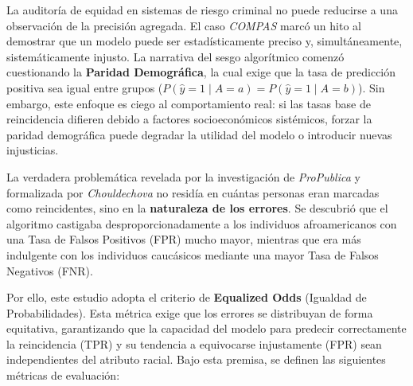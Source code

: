 \documentclass[11pt,a4paper]{article}
\begin{document}
La auditoría de equidad en sistemas de riesgo criminal no puede reducirse a una observación de la precisión agregada. El caso \textit{COMPAS} \cite{angwin2016machine} marcó un hito al demostrar que un modelo puede ser estadísticamente preciso y, simultáneamente, sistemáticamente injusto. La narrativa del sesgo algorítmico comenzó cuestionando la \textbf{Paridad Demográfica}, la cual exige que la tasa de predicción positiva sea igual entre grupos ($P(\hat{y}=1 \mid A=a) = P(\hat{y}=1 \mid A=b)$). Sin embargo, este enfoque es ciego al comportamiento real: si las tasas base de reincidencia difieren debido a factores socioeconómicos sistémicos, forzar la paridad demográfica puede degradar la utilidad del modelo o introducir nuevas injusticias.

La verdadera problemática revelada por la investigación de \textit{ProPublica} \cite{angwin2016machine} y formalizada por \textit{Chouldechova} \cite{chouldechova2017fair} no residía en cuántas personas eran marcadas como reincidentes, sino en la \textbf{naturaleza de los errores}. Se descubrió que el algoritmo castigaba desproporcionadamente a los individuos afroamericanos con una Tasa de Falsos Positivos (FPR) mucho mayor, mientras que era más indulgente con los individuos caucásicos mediante una mayor Tasa de Falsos Negativos (FNR).

Por ello, este estudio adopta el criterio de \textbf{Equalized Odds} (Igualdad de Probabilidades). Esta métrica exige que los errores se distribuyan de forma equitativa, garantizando que la capacidad del modelo para predecir correctamente la reincidencia (TPR) y su tendencia a equivocarse injustamente (FPR) sean independientes del atributo racial. Bajo esta premisa, se definen las siguientes métricas de evaluación:
\end{document}
